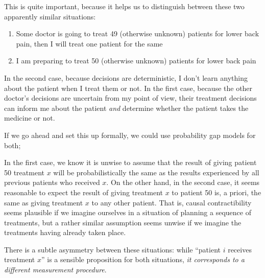 This is quite important, because it helps us to distinguish between these two apparently similar situations:

\begin{enumerate}
    \item Some doctor is going to treat 49 (otherwise unknown) patients for lower back pain, then I will treat one patient for the same
    \item I am preparing to treat 50 (otherwise unknown) patients for lower back pain
\end{enumerate}

In the second case, because decisions are deterministic, I don't learn anything about the patient when I treat them or not. In the first case, because the other doctor's decisions are uncertain from my point of view, their treatment decisions can inform me about the patient \emph{and} determine whether the patient takes the medicine or not.

If we go ahead and set this up formally, we could use probability gap models for both; 

In the first case, we know it is unwise to assume that the result of giving patient 50 treatment $x$ will be probabilistically the same as the results experienced by all previous patients who received $x$. On the other hand, in the second case, it seems reasonable to expect the result of giving treatment $x$ to patient 50 is, a priori, the same as giving treatment $x$ to any other patient. That is, causal contractibility seems plausible if we imagine ourselves in a situation of planning a sequence of treatments, but a rather similar assumption seems unwise if we imagine the treatments having already taken place.

There is a subtle asymmetry between these situations: while ``patient $i$ receives treatment $x$'' is a sensible proposition for both situations, \emph{it corresponds to a different measurement procedure}.  